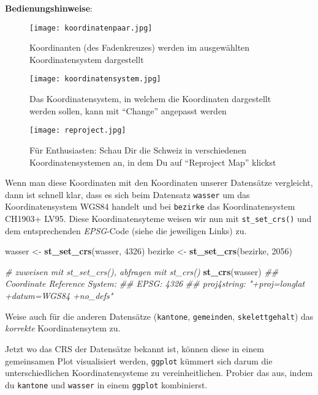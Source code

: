 \documentclass[]{book}
\newenvironment{Shaded}{\begin{snugshade}}{\end{snugshade}}
\newcommand{\CommentTok}[1]{\textcolor[rgb]{0.56,0.35,0.01}{\textit{#1}}}
\newcommand{\DecValTok}[1]{\textcolor[rgb]{0.00,0.00,0.81}{#1}}
\newcommand{\KeywordTok}[1]{\textcolor[rgb]{0.13,0.29,0.53}{\textbf{#1}}}
\newcommand{\NormalTok}[1]{#1}
\newcommand{\StringTok}[1]{\textcolor[rgb]{0.31,0.60,0.02}{#1}}
\begin{document}
\textbf{Bedienungshinweise}:

\begin{figure}
\centering
\texttt{[image: koordinatenpaar.jpg]}
\caption{Koordinanten (des Fadenkreuzes) werden im ausgewählten Koordinatensystem dargestellt}
\end{figure}

\begin{figure}
\centering
\texttt{[image: koordinatensystem.jpg]}
\caption{Das Koordinatensystem, in welchem die Koordinaten dargestellt werden sollen, kann mit ``Change'' angepasst werden}
\end{figure}

\begin{figure}
\centering
\texttt{[image: reproject.jpg]}
\caption{Für Enthusiasten: Schau Dir die Schweiz in verschiedenen Koordinatensystemen an, in dem Du auf ``Reproject Map'' klickst}
\end{figure}

Wenn man diese Koordinaten mit den Koordinaten unserer Datensätze vergleicht, dann ist schnell klar, dass es sich beim Datensatz \texttt{wasser} um das Koordinatensystem WGS84 handelt und bei \texttt{bezirke} das Koordinatensystem CH1903+ LV95. Diese Koordinatensyteme weisen wir nun mit \texttt{st\_set\_crs()} und dem entsprechenden \emph{EPSG}-Code (siehe die jeweiligen Links) zu.

\begin{Shaded}
\begin{Highlighting}[]
\NormalTok{wasser <-}\StringTok{ }\KeywordTok{st_set_crs}\NormalTok{(wasser, }\DecValTok{4326}\NormalTok{)}
\NormalTok{bezirke <-}\StringTok{ }\KeywordTok{st_set_crs}\NormalTok{(bezirke, }\DecValTok{2056}\NormalTok{)}

\CommentTok{# zuweisen mit st_set_crs(), abfragen mit st_crs()}
\KeywordTok{st_crs}\NormalTok{(wasser)}
\CommentTok{## Coordinate Reference System:}
\CommentTok{##   EPSG: 4326 }
\CommentTok{##   proj4string: "+proj=longlat +datum=WGS84 +no_defs"}
\end{Highlighting}
\end{Shaded}

Weise auch für die anderen Datensätze (\texttt{kantone}, \texttt{gemeinden}, \texttt{skelettgehalt}) das \emph{korrekte} Koordinatensytem zu.

Jetzt wo das CRS der Datensätze bekannt ist, können diese in einem gemeinsamen Plot visualisiert werden, \texttt{ggplot} kümmert sich darum die unterschiedlichen Koordinatensysteme zu vereinheitlichen. Probier das aus, indem du \texttt{kantone} und \texttt{wasser} in einem \texttt{ggplot} kombinierst.
\end{document}
